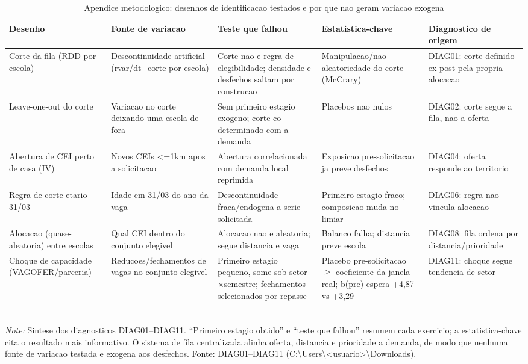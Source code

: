 \begin{table}[htbp]\centering
\caption{Apendice metodologico: desenhos de identificacao testados e por que nao geram variacao exogena}
\label{tab:T10_desenhos}
\small
\setlength{\tabcolsep}{4pt}
\begin{tabular}{p{2.4cm}p{2.6cm}p{3.2cm}p{2.8cm}p{2.4cm}}
\toprule
Desenho & Fonte de variacao & Teste que falhou & Estatistica-chave & Diagnostico de origem \\
\midrule
Corte da fila (RDD por escola) & Descontinuidade artificial (rvar/dt\_corte por escola) & Corte nao e regra de elegibilidade; densidade e desfechos saltam por construcao & Manipulacao/nao-aleatoriedade do corte (McCrary) & DIAG01: corte definido ex-post pela propria alocacao \\
Leave-one-out do corte & Variacao no corte deixando uma escola de fora & Sem primeiro estagio exogeno; corte co-determinado com a demanda & Placebos nao nulos & DIAG02: corte segue a fila, nao a oferta \\
Abertura de CEI perto de casa (IV) & Novos CEIs <=1km apos a solicitacao & Abertura correlacionada com demanda local reprimida & Exposicao pre-solicitacao ja preve desfechos & DIAG04: oferta responde ao territorio \\
Regra de corte etario 31/03 & Idade em 31/03 do ano da vaga & Descontinuidade fraca/endogena a serie solicitada & Primeiro estagio fraco; composicao muda no limiar & DIAG06: regra nao vincula alocacao \\
Alocacao (quase-aleatoria) entre escolas & Qual CEI dentro do conjunto elegivel & Alocacao nao e aleatoria; segue distancia e vaga & Balanco falha; distancia preve escola & DIAG08: fila ordena por distancia/prioridade \\
Choque de capacidade (VAGOFER/parceria) & Reducoes/fechamentos de vagas no conjunto elegivel & Primeiro estagio pequeno, some sob setor$\times$semestre; fechamentos selecionados por repasse & Placebo pre-solicitacao $\geq$ coeficiente da janela real; b(pre) espera +4,87 vs +3,29 & DIAG11: choque segue tendencia de setor \\
\bottomrule
\end{tabular}
\\[3pt]{\footnotesize \textit{Note:} Sintese dos diagnosticos DIAG01--DIAG11. ``Primeiro estagio obtido'' e ``teste que falhou'' resumem cada exercicio; a estatistica-chave cita o resultado mais informativo. O sistema de fila centralizada alinha oferta, distancia e prioridade a demanda, de modo que nenhuma fonte de variacao testada e exogena aos desfechos. Fonte: DIAG01--DIAG11 (C:\textbackslash Users\textbackslash <usuario>\textbackslash Downloads).}
\end{table}
